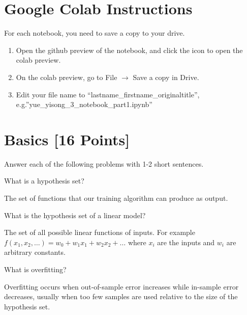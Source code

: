 \section*{Google Colab Instructions}

For each notebook, you need to save a copy to your drive.

\begin{enumerate}
  \item Open the github preview of the notebook, and click the icon to open the colab preview.
  \item On the colab preview, go to File $\rightarrow$ Save a copy in Drive.
  \item Edit your file name to “lastname_firstname_originaltitle”, e.g.”yue_yisong_3_notebook_part1.ipynb”
\end{enumerate}


\newpage
\section{Basics [16 Points]}

Answer each of the following problems with 1-2 short sentences.

\begin{problem}[2]
  What is a hypothesis set?
\end{problem}
\begin{solution}
  The set of functions that our training algorithm can produce as output.
\end{solution}

\begin{problem}[2]
  What is the hypothesis set of a linear model?
\end{problem}
\begin{solution}
  The set of all possible linear functions of inputs.
  For example $f(x_1, x_2, \dots) = w_0 + w_1 x_1 + w_2 x_2 + \dots$ where $x_i$ are the inputs and $w_i$ are arbitrary constants.
\end{solution}

\begin{problem}[2]
  What is overfitting?
\end{problem}
\begin{solution}
  Overfitting occurs when out-of-sample error increases while in-sample error decreases, usually when too few samples are used relative to the size of the hypothesis set.
\end{solution}

